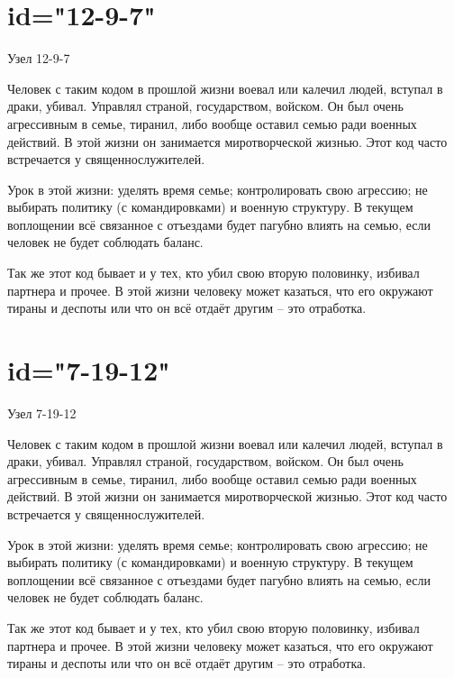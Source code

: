 \section{id="12-9-7"}{Узел 12-9-7}
\item Человек с таким кодом в прошлой жизни воевал или калечил 
людей, вступал в драки, убивал. Управлял страной, государством, 
войском. Он был очень агрессивным в семье, тиранил, либо вообще 
оставил семью ради военных действий. В этой жизни он занимается 
миротворческой жизнью. Этот код часто встречается у 
священнослужителей.
\item Урок в этой жизни: уделять время семье; контролировать 
свою агрессию; не выбирать политику (с командировками) и 
военную структуру. В текущем воплощении всё связанное с 
отъездами будет пагубно влиять на семью, если человек не будет 
соблюдать баланс.
\item Так же этот код бывает и у тех, кто убил свою вторую 
половинку, избивал партнера и прочее. В этой жизни человеку 
может казаться, что его окружают тираны и деспоты или что он 
всё отдаёт другим – это отработка.
\endsection

\section{id="7-19-12"}{Узел 7-19-12}
\item Человек с таким кодом в прошлой жизни воевал или калечил 
людей, вступал в драки, убивал. Управлял страной, государством, 
войском. Он был очень агрессивным в семье, тиранил, либо вообще 
оставил семью ради военных действий. В этой жизни он занимается 
миротворческой жизнью. Этот код часто встречается у 
священнослужителей.
\item Урок в этой жизни: уделять время семье; контролировать 
свою агрессию; не выбирать политику (с командировками) и 
военную структуру. В текущем воплощении всё связанное с 
отъездами будет пагубно влиять на семью, если человек не будет 
соблюдать баланс.
\item Так же этот код бывает и у тех, кто убил свою вторую 
половинку, избивал партнера и прочее. В этой жизни человеку 
может казаться, что его окружают тираны и деспоты или что он 
всё отдаёт другим – это отработка.
\endsection

